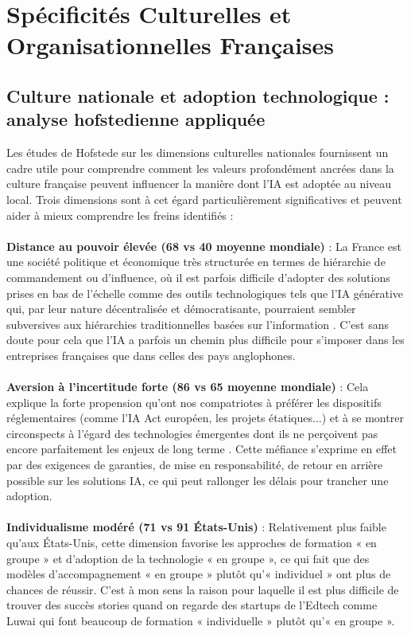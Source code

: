 \section{Spécificités Culturelles et Organisationnelles Françaises}

\subsection{Culture nationale et adoption technologique : analyse hofstedienne appliquée}

Les études de Hofstede sur les dimensions culturelles nationales \cite{hofstede2001culture} fournissent un cadre utile pour comprendre comment les valeurs profondément ancrées dans la culture française peuvent influencer la manière dont l'IA est adoptée au niveau local. Trois dimensions sont à cet égard particulièrement significatives et peuvent aider à mieux comprendre les freins identifiés :
\\\\
\textbf{Distance au pouvoir élevée (68 vs 40 moyenne mondiale)} : La France est une société politique et économique très structurée en termes de hiérarchie de commandement ou d’influence, où il est parfois difficile d'adopter des solutions prises en bas de l'échelle comme des outils technologiques tels que l'IA générative qui, par leur nature décentralisée et démocratisante, pourraient sembler subversives aux hiérarchies traditionnelles basées sur l'information \cite{meyer2014culture}. C'est sans doute pour cela que l'IA a parfois un chemin plus difficile pour s'imposer dans les entreprises françaises que dans celles des pays anglophones.
\\\\
\textbf{Aversion à l'incertitude forte (86 vs 65 moyenne mondiale)} : Cela explique la forte propension qu'ont nos compatriotes à préférer les dispositifs réglementaires (comme l'IA Act européen, les projets étatiques...) et à se montrer circonspects à l'égard des technologies émergentes dont ils ne perçoivent pas encore parfaitement les enjeux de long terme \cite{bertolucci2024artificial}. Cette méfiance s'exprime en effet par des exigences de garanties, de mise en responsabilité, de retour en arrière possible sur les solutions IA, ce qui peut rallonger les délais pour trancher une adoption.
\\\\
\textbf{Individualisme modéré (71 vs 91 États-Unis)} : Relativement plus faible qu'aux États-Unis, cette dimension favorise les approches de formation « en groupe » et d'adoption de la technologie « en groupe », ce qui fait que des modèles d'accompagnement « en groupe » plutôt qu'« individuel » ont plus de chances de réussir. C'est à mon sens la raison pour laquelle il est plus difficile de trouver des succès stories quand on regarde des startups de l'Edtech comme Luwai qui font beaucoup de formation « individuelle » plutôt qu'« en groupe ».

